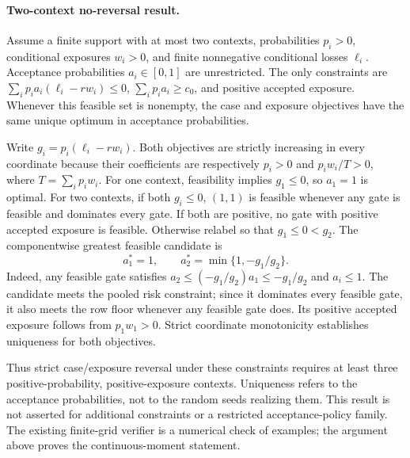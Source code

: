 \paragraph{Two-context no-reversal result.}
Assume a finite support with at most two contexts, probabilities $p_i>0$,
conditional exposures $w_i>0$, and finite nonnegative conditional losses
$\ell_i$. Acceptance probabilities $a_i\in[0,1]$ are unrestricted.
The only constraints are $\sum_i p_i a_i(\ell_i-rw_i)\leq0$,
$\sum_i p_i a_i\geq c_0$, and positive accepted exposure.
Whenever this feasible set is nonempty, the case and exposure objectives
have the same unique optimum in acceptance probabilities.

Write $g_i=p_i(\ell_i-rw_i)$. Both objectives are strictly increasing
in every coordinate because their coefficients are respectively $p_i>0$
and $p_iw_i/T>0$, where $T=\sum_i p_iw_i$.
For one context, feasibility implies $g_1\leq0$, so $a_1=1$ is optimal.
For two contexts, if both $g_i\leq0$, $(1,1)$ is feasible whenever any gate
is feasible and dominates every gate. If both are positive, no gate with
positive accepted exposure is feasible. Otherwise relabel so that
$g_1\leq0<g_2$. The componentwise greatest feasible candidate is
\[
 a_1^*=1,\qquad a_2^*=\min\{1,-g_1/g_2\}.
\]
Indeed, any feasible gate satisfies
$a_2\leq(-g_1/g_2)a_1\leq-g_1/g_2$ and $a_i\leq1$.
The candidate meets the pooled risk constraint; since it dominates every
feasible gate, it also meets the row floor whenever any feasible gate does.
Its positive accepted exposure follows from $p_1w_1>0$.
Strict coordinate monotonicity establishes uniqueness for both objectives.

Thus strict case/exposure reversal under these constraints requires at least
three positive-probability, positive-exposure contexts. Uniqueness refers to
the acceptance probabilities, not to the random seeds realizing them.
This result is not asserted for additional constraints or a restricted
acceptance-policy family. The existing finite-grid verifier is a numerical
check of examples; the argument above proves the continuous-moment statement.
